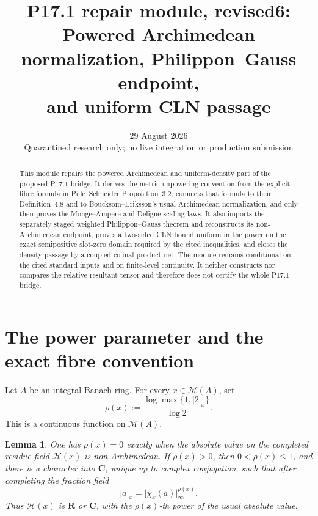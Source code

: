 \documentclass[11pt]{article}
\title{P17.1 repair module, revised6:\\
Powered Archimedean normalization, Philippon--Gauss endpoint,\\
and uniform CLN passage}
\author{}
\date{29 August 2026\\\small Quarantined research only; no live integration or production submission}
\newtheorem{lemma}[theorem]{Lemma}
\newcommand{\cM}{\mathcal M}
\newcommand{\R}{\mathbf R}
\newcommand{\C}{\mathbf C}
\newcommand{\abs}[1]{\lvert#1\rvert}
\begin{document}
\maketitle

\begin{abstract}
This module repairs the powered Archimedean and uniform-density part of the
proposed P17.1 bridge.  It derives the metric unpowering convention from the
explicit fibre formula in Pille--Schneider Proposition~3.2, connects that
formula to their Definition~4.8 and to Boucksom--Eriksson's usual
Archimedean normalization, and only then proves the Monge--Ampere and Deligne
scaling laws.  It also imports the separately staged weighted
Philippon--Gauss theorem and reconstructs its non-Archimedean endpoint,
proves a two-sided CLN bound uniform in the power on the exact semipositive
slot-zero domain required by the cited inequalities, and closes the density passage by a
coupled cofinal product net.  The module remains conditional on the cited
standard inputs and on finite-level continuity.  It neither constructs nor
compares the relative resultant tensor and therefore does not certify the
whole P17.1 bridge.
\end{abstract}

\section{The power parameter and the exact fibre convention}

Let $A$ be an integral Banach ring.  For every $x\in\cM(A)$, set
\begin{equation}
 \rho(x):=\frac{\log\max\{1,\abs{2}_x\}}{\log 2}.
\tag{1.1}\label{eq:rho-base}
\end{equation}
This is a continuous function on $\cM(A)$.

\begin{lemma}
\label{lem:rho-split}
One has $\rho(x)=0$ exactly when the absolute value on the completed residue
field $\mathcal H(x)$ is non-Archimedean.  If $\rho(x)>0$, then
$0<\rho(x)\leq1$, and there is a character into $\C$, unique up to complex
conjugation, such that after completing the fraction field
\begin{equation}
 \abs{a}_x=\abs{\chi_x(a)}_\infty^{\rho(x)}.
\tag{1.2}\label{eq:character-power}
\end{equation}
Thus $\mathcal H(x)$ is $\R$ or $\C$, with the
$\rho(x)$-th power of the usual absolute value.
\end{lemma}
\end{document}
